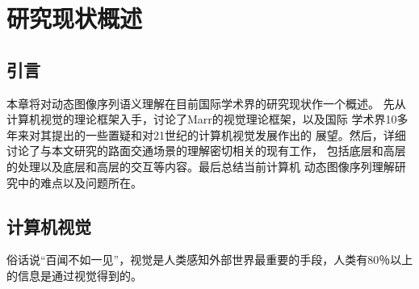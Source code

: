 \chapter{研究现状概述}
\label{chap2}

\section{引言}

本章将对动态图像序列语义理解在目前国际学术界的研究现状作一个概述。
先从计算机视觉的理论框架入手，讨论了Marr的视觉理论框架，以及国际
学术界10多年来对其提出的一些置疑和对21世纪的计算机视觉发展作出的
展望。然后，详细讨论了与本文研究的路面交通场景的理解密切相关的现有工作，
包括底层和高层的处理以及底层和高层的交互等内容。最后总结当前计算机
动态图像序列理解研究中的难点以及问题所在。

\section{计算机视觉}

俗话说``百闻不如一见''，视觉是人类感知外部世界最重要的手段，人类有80％以上
的信息是通过视觉得到的。
